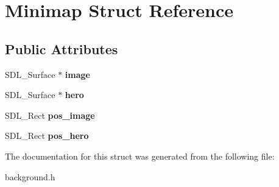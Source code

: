 \hypertarget{structMinimap}{}\section{Minimap Struct Reference}
\label{structMinimap}
\subsection*{Public Attributes}
\begin{DoxyCompactItemize}
\item 
\mbox{\label{structMinimap_ae1792d7a5459227ec30b7c1e84a586fc}} 
S\+D\+L\+\_\+\+Surface $\ast$ {\bfseries image}
\item 
\mbox{\label{structMinimap_a8ed3ce99bcaf1dfc85548642abe7b8c7}} 
S\+D\+L\+\_\+\+Surface $\ast$ {\bfseries hero}
\item 
\mbox{\label{structMinimap_a36d34abc386e8bae78f7adf4c43e6f0d}} 
S\+D\+L\+\_\+\+Rect {\bfseries pos\+\_\+image}
\item 
\mbox{\label{structMinimap_a6b55710065e1c7b804d48fa8087f8824}} 
S\+D\+L\+\_\+\+Rect {\bfseries pos\+\_\+hero}
\end{DoxyCompactItemize}


The documentation for this struct was generated from the following file\+:\begin{DoxyCompactItemize}
\item 
background.\+h\end{DoxyCompactItemize}
